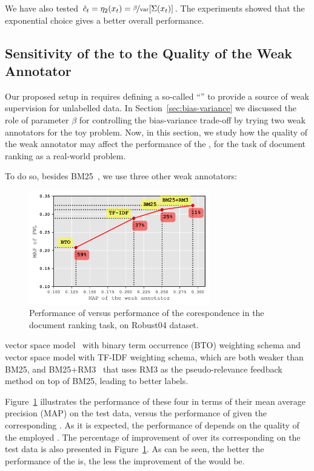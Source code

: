 We have also tested $\hat{c}_t = \eta_2(x_t) = \nicefrac{\beta}{\rm var}[\Sigma(x_t)]$.  The experiments showed that the exponential choice gives a better overall performance. 


\subsection{Sensitivity of the \fwl to the Quality of the Weak Annotator}
Our proposed setup in \fwl requires defining a so-called ``\wa'' to provide a source of weak supervision for unlabelled data. In Section~\ref{sec:bias-variance} we discussed the role of parameter $\beta$ for controlling the bias-variance trade-off by trying two weak annotators for the toy problem. 
Now, in this section, we study how the quality of the weak annotator may affect the performance of the \fwl, for the task of document ranking as a real-world problem.

To do so, besides BM25~\citep{Robertson:2009}, we use three other weak annotators: 
\begin{figure}[t]
    \centering
    \includegraphics[width=0.7\textwidth]{03-part-02/chapter-05/figs_and_tables/plot_sensitivity_fwl.png}
    \caption{Performance of \fwl versus performance of the corespondence \wa in the document ranking task, on Robust04 dataset.}
    \label{fig:sensitivity}
\end{figure}
vector space model~\citep{salton1973specification} with binary term occurrence (BTO) weighting schema and vector
space model with TF-IDF weighting schema, which are both weaker than BM25, 
and BM25+RM3~\citep{Abdul-jaleel:2004} that uses RM3 as the pseudo-relevance feedback method on top of BM25, leading to better labels. 

Figure~\ref{fig:sensitivity} illustrates the performance of these four \was in terms of their mean average precision (MAP) on the test data, versus the performance of \fwl given the corresponding \wa. As it is expected, the performance of \fwl depends on the quality of the employed \wa.
The percentage of improvement of \fwl over its corresponding \wa on the test data is also presented in Figure~\ref{fig:sensitivity}. As can be seen, the better the performance of the \wa is, the less the improvement of the \fwl would be. 



